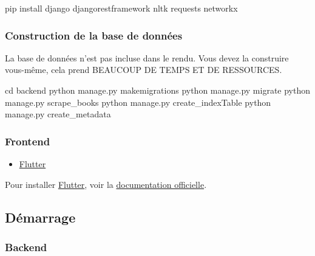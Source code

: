 \documentclass[
  12pt,
]{article}
\newenvironment{Shaded}{}{}
\newcommand{\BuiltInTok}[1]{\textcolor[rgb]{0.00,0.50,0.00}{#1}}
\newcommand{\ExtensionTok}[1]{#1}
\newcommand{\NormalTok}[1]{#1}
\providecommand{\tightlist}{%
  \setlength{\itemsep}{0pt}\setlength{\parskip}{0pt}}
\begin{document}
\begin{Shaded}
\begin{Highlighting}[]
\ExtensionTok{pip}\NormalTok{ install django djangorestframework nltk requests networkx}
\end{Highlighting}
\end{Shaded}

\subsubsection{Construction de la base de
données}\label{construction-de-la-base-de-donnuxe9es}

La base de données n'est pas incluse dans le rendu. Vous devez la
construire vous-même, cela prend BEAUCOUP DE TEMPS ET DE RESSOURCES.

\begin{Shaded}
\begin{Highlighting}[]
\BuiltInTok{cd}\NormalTok{ backend}
\ExtensionTok{python}\NormalTok{ manage.py makemigrations}
\ExtensionTok{python}\NormalTok{ manage.py migrate}
\ExtensionTok{python}\NormalTok{ manage.py scrape\_books}
\ExtensionTok{python}\NormalTok{ manage.py create\_indexTable}
\ExtensionTok{python}\NormalTok{ manage.py create\_metadata}
\end{Highlighting}
\end{Shaded}

\subsubsection{Frontend}\label{frontend}

\begin{itemize}
\tightlist
\item
  \href{https://flutter.dev/}{Flutter}
\end{itemize}

Pour installer \href{https://flutter.dev/}{Flutter}, voir la
\href{https://flutter.dev/docs/get-started/install}{documentation
officielle}.

\newpage

\subsection{Démarrage}\label{duxe9marrage}

\subsubsection{Backend}\label{backend-1}
\end{document}
